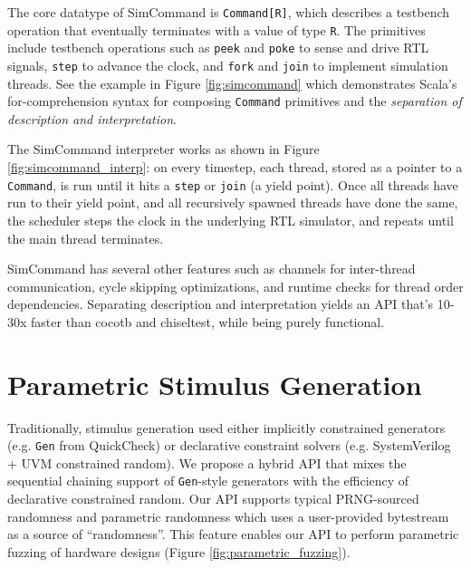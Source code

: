 \documentclass[sigplan,review,nonacm,9pt]{acmart}
\begin{document}
The core datatype of SimCommand is \texttt{Command[R]}, which describes a testbench operation that eventually terminates with a value of type \texttt{R}.
The primitives include testbench operations such as \texttt{peek} and \texttt{poke} to sense and drive RTL signals, \texttt{step} to advance the clock, and \texttt{fork} and \texttt{join} to implement simulation threads.
See the example in Figure \ref{fig:simcommand} which demonstrates Scala's for-comprehension syntax for composing \texttt{Command} primitives and the \textit{separation of description and interpretation}.

The SimCommand interpreter works as shown in Figure \ref{fig:simcommand_interp}: on every timestep, each thread, stored as a pointer to a \texttt{Command}, is run until it hits a \texttt{step} or \texttt{join} (a yield point).
Once all threads have run to their yield point, and all recursively spawned threads have done the same, the scheduler steps the clock in the underlying RTL simulator, and repeats until the main thread terminates.

SimCommand has several other features such as channels for inter-thread communication, cycle skipping optimizations, and runtime checks for thread order dependencies.
Separating description and interpretation yields an API that's 10-30x faster than cocotb and chiseltest, while being purely functional.


\section{Parametric Stimulus Generation}

Traditionally, stimulus generation used either implicitly constrained generators (e.g. \texttt{Gen} from QuickCheck\cite{quickcheck}) or declarative constraint solvers (e.g. SystemVerilog + UVM constrained random\cite{riscv_dv}).
We propose a hybrid API that mixes the sequential chaining support of \texttt{Gen}-style generators with the efficiency of declarative constrained random.
Our API supports typical PRNG-sourced randomness and parametric randomness which uses a user-provided bytestream as a source of ``randomness''.
This feature enables our API to perform parametric fuzzing\cite{zest} of hardware designs (Figure \ref{fig:parametric_fuzzing}).
\end{document}
